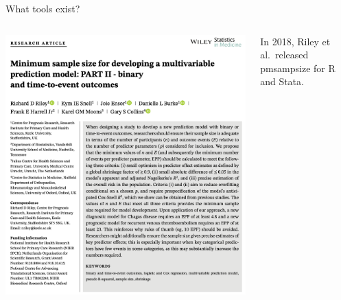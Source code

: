 \documentclass[11pt]{beamer}
\begin{document}
\begin{frame}[t]{What tools exist?}
	\begin{columns}
		\begin{column}[c]{0.6\textwidth}
			\includegraphics[width=\textwidth]{figures/riley2.png}%
		\end{column}
		\begin{column}[T]{0.4\textwidth}
			\centering
			\vspace{-4em}
			In 2018, Riley et al.\ released pmsampsize\autocite{riley2021} for R and Stata.
		\end{column}
	\end{columns}

\end{frame}
\end{document}
